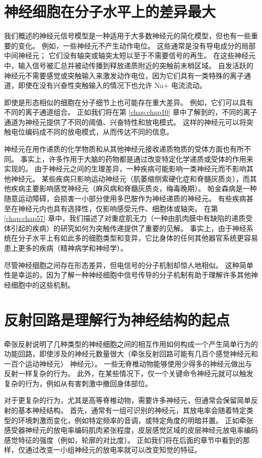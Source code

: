 \section{神经细胞在分子水平上的差异最大}
我们概述的神经元信号模型是一种适用于大多数神经元的简化模型，但也有一些重要的变化。 
例如，一些神经元不产生动作电位。 
这些通常是没有导电成分的局部中间神经元； 它们没有轴突或轴突太短以至于不需要信号的再生。 
在这些神经元中，输入信号被汇总并被动传播到释放递质附近的突触前末梢区域。 
自发活跃的神经元不需要感觉或突触输入来激发动作电位，因为它们具有一类特殊的离子通道，即使在没有兴奋性突触输入的情况下也允许 Na+ 电流流动。


即使是形态相似的细胞在分子细节上也可能存在重大差异。 
例如，它们可以具有不同的离子通道组合。 
正如我们将在第 \ref{chap:chap10} 章中了解到的，不同的离子通道为神经元提供了不同的阈值、兴奋特性和放电模式。 
这样的神经元可以将突触电位编码成不同的放电模式，从而传达不同的信息。


神经元在用作递质的化学物质和从其他神经元接收递质物质的受体方面也有所不同。 
事实上，许多作用于大脑的药物都是通过改变特定化学递质或受体的作用来实现的。 
由于神经元之间的生理差异，一种疾病可能影响一类神经元而不影响其他神经元。 
某些疾病只影响运动神经元（肌萎缩侧索硬化症和脊髓灰质炎），而其他疾病主要影响感觉神经元（麻风病和脊髓灰质炎，梅毒晚期）。 
帕金森病是一种随意运动障碍，会损害一小部分使用多巴胺作为神经递质的神经元。 
有些疾病甚至在神经元内也具有选择性，仅影响感受元件、细胞体或轴突。 
在第 \ref{chap:chap57} 章中，我们描述了对重症肌无力（一种由肌肉膜中有缺陷的递质受体引起的疾病）的研究如何为突触传递提供了重要的见解。 
事实上，由于神经系统在分子水平上有如此多的细胞类型和变异，它比身体的任何其他器官系统更容易患上更多的疾病（精神病学和神经学）。


尽管神经细胞之间存在形态差异，但电信号的分子机制却惊人地相似。 
这种简单性是幸运的，因为了解一种神经细胞中信号传导的分子机制有助于理解许多其他神经细胞中的这些机制。


\section{反射回路是理解行为神经结构的起点}
牵张反射说明了几种类型的神经细胞之间的相互作用如何构成一个产生简单行为的功能回路，即使涉及的神经元数量很大（牵张反射回路可能有几百个感觉神经元和一百个运动神经元） 神经元）。 
一些无脊椎动物能够使用少得多的神经元做出与反射一样复杂的行为。 
此外，在某些情况下，仅一个关键命令神经元就可以触发复杂的行为，例如从有害刺激中撤回身体部位。


对于更复杂的行为，尤其是高等脊椎动物，需要许多神经元，但通常会保留简单反射的基本神经结构。 
首先，通常有一组可识别的神经元，其放电率会随着特定类型的环境刺激而变化，例如特定频率的音调，或特定角度的明暗并置。 
正如牵张感受器神经元的放电率编码肌肉紧张程度，皮层感觉区域的皮层神经元放电率编码感觉特征的强度（例如，轮廓的对比度）。 
正如我们将在后面的章节中看到的那样，仅通过改变一小组神经元的放电率就可以改变知觉的特征。


